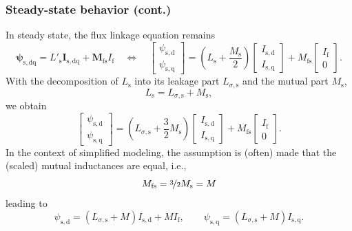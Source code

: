 \begin{frame}
	\frametitle{Steady-state behavior (cont.)}
	In steady state, the flux linkage equation remains
	$$\bm{\psi}_\mathrm{s,dq} =  L'_\mathrm{s} \bm{I}_\mathrm{s,dq} + \bm{M}_\mathrm{fs} I_{\mathrm{f}} \quad \Leftrightarrow \quad \begin{bmatrix}
		\psi_\mathrm{s,d} \\ \psi_\mathrm{s,q}
	\end{bmatrix} = \left(L_\mathrm{s} +\frac{M_\mathrm{s}}{2}\right)\begin{bmatrix}
		I_\mathrm{s,d} \\ I_\mathrm{s,q}
	\end{bmatrix} + M_\mathrm{fs} \begin{bmatrix}
		I_\mathrm{f} \\ 0
	\end{bmatrix}.$$
	With the decomposition of $L_\mathrm{s}$ into its leakage part $L_{\sigma,\mathrm{s}}$ and the mutual part $M_\mathrm{s}$, 
	\begin{equation}
		L_\mathrm{s} = L_{\sigma,\mathrm{s}} + M_{\mathrm{s}}, 
	\end{equation}
	we obtain
	\begin{equation}
		\begin{bmatrix}
			\psi_\mathrm{s,d} \\ \psi_\mathrm{s,q}
		\end{bmatrix} = \left(L_{\sigma,\mathrm{s}} + \frac{3}{2}M_\mathrm{s}\right)\begin{bmatrix}
			I_\mathrm{s,d} \\ I_\mathrm{s,q}
		\end{bmatrix} + M_\mathrm{fs} \begin{bmatrix}
			I_\mathrm{f} \\ 0
		\end{bmatrix}.
		\end{equation}
		In the context of simplified modeling, the assumption is (often) made that the (scaled) mutual inductances are equal, i.e., $$M_\mathrm{fs} = \nicefrac{3}{2} M_\mathrm{s} = M$$ leading to
		\begin{equation}
				\psi_\mathrm{s,d} = \left(L_{\sigma,\mathrm{s}} + M\right)I_\mathrm{s,d} + M I_\mathrm{f}, \qquad \psi_\mathrm{s,q} = \left(L_{\sigma,\mathrm{s}} + M\right)I_\mathrm{s,q}.
				\label{eq:SM_stator_flux_linkage_steady_state}
		\end{equation}
\end{frame}

